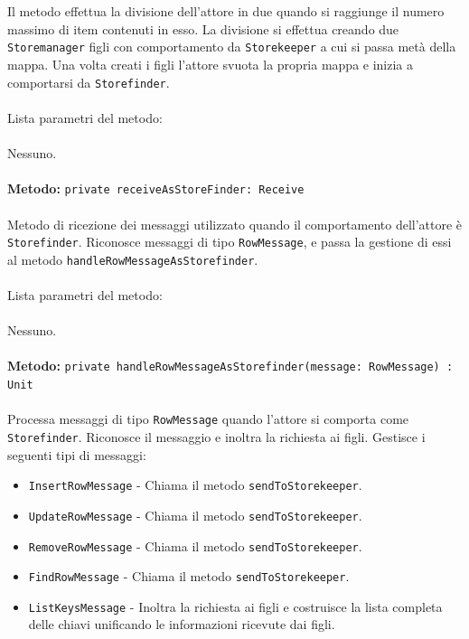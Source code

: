 \documentclass[a4paper]{article}
\begin{document}
			\\ \\
				Il metodo effettua la divisione dell'attore in due quando si raggiunge il numero massimo di item contenuti in esso. La divisione si effettua creando due \texttt{Storemanager} figli con comportamento da \texttt{Storekeeper} a cui si passa metà della mappa. Una volta creati i figli l'attore svuota la propria mappa e inizia a comportarsi da \texttt{Storefinder}.
			\\ \\
			Lista parametri del metodo:
			\\ \\
				Nessuno. 
			\\ \\
		\textbf{Metodo: }\texttt{private receiveAsStoreFinder: Receive}
			\\ \\
			Metodo di ricezione dei messaggi utilizzato quando il comportamento dell'attore è \texttt{Storefinder}. Riconosce messaggi di tipo \texttt{RowMessage}, e passa la gestione di essi al metodo \texttt{handleRowMessageAsStorefinder}.
			\\ \\
			Lista parametri del metodo:
			\\ \\
			Nessuno.
			\\ \\
		\textbf{Metodo: }\texttt{private handleRowMessageAsStorefinder(message: RowMessage) : Unit}
			\\ \\
			Processa messaggi di tipo \texttt{RowMessage} quando l'attore si comporta come \texttt{Storefinder}. Riconosce il messaggio e inoltra la richiesta ai figli.
			Gestisce i seguenti tipi di messaggi:
			\begin{itemize}
				\item \texttt{InsertRowMessage} - Chiama il metodo \texttt{sendToStorekeeper}.
				\item \texttt{UpdateRowMessage} - Chiama il metodo \texttt{sendToStorekeeper}.
				\item \texttt{RemoveRowMessage} - Chiama il metodo \texttt{sendToStorekeeper}.
				\item \texttt{FindRowMessage} - Chiama il metodo \texttt{sendToStorekeeper}.
				\item \texttt{ListKeysMessage} - Inoltra la richiesta ai figli e costruisce la lista completa delle chiavi unificando le informazioni ricevute dai figli.
			\end{itemize}
\end{document}
